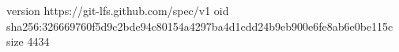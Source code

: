 version https://git-lfs.github.com/spec/v1
oid sha256:326669760f5d9c2bde94c80154a4297ba4d1cdd24b9eb900e6fe8ab6e0be115c
size 4434
